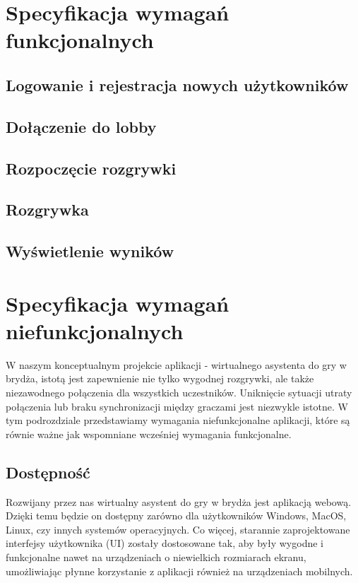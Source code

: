


\section{Specyfikacja wymagań funkcjonalnych}
\subsection{Logowanie i rejestracja nowych użytkowników}
\subsection{Dołączenie do lobby}
\subsection{Rozpoczęcie rozgrywki}
\subsection{Rozgrywka}
\subsection{Wyświetlenie wyników}

\section{Specyfikacja wymagań niefunkcjonalnych}
W naszym konceptualnym projekcie aplikacji - wirtualnego asystenta do gry w brydża, istotą jest zapewnienie nie tylko wygodnej rozgrywki, ale także niezawodnego połączenia dla wszystkich uczestników. Uniknięcie sytuacji utraty połączenia lub braku synchronizacji między graczami jest niezwykle istotne. W tym podrozdziale przedstawiamy wymagania niefunkcjonalne aplikacji, które są równie ważne jak wspomniane wcześniej wymagania funkcjonalne.
\subsection{Dostępność}
Rozwijany przez nas wirtualny asystent do gry w brydża jest aplikacją webową. Dzięki temu będzie on dostępny zarówno dla użytkowników Windows, MacOS, Linux, czy innych systemów operacyjnych. Co więcej, starannie zaprojektowane interfejsy użytkownika (UI) zostały dostosowane tak, aby były wygodne i funkcjonalne nawet na urządzeniach o niewielkich rozmiarach ekranu, umożliwiając płynne korzystanie z aplikacji również na urządzeniach mobilnych.
